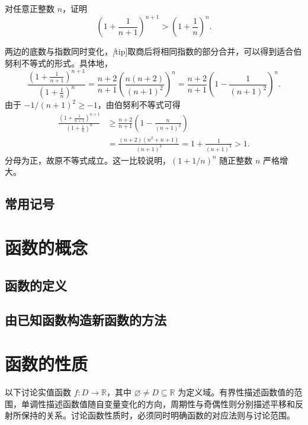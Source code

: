 \begin{example}
\label{ex:bernoulli-adjacent-powers}
对任意正整数 $n$，证明
\[
    \left(1+\frac1{n+1}\right)^{n+1}
    >\left(1+\frac1n\right)^n.
\]
\end{example}

\begin{solve}
两边的底数与指数同时变化，\emph[tip]{取商后将相同指数的部分合并，可以得到适合伯努利不等式的形式。}具体地，
\[
    \frac{\left(1+\frac1{n+1}\right)^{n+1}}
         {\left(1+\frac1n\right)^n}
    =\frac{n+2}{n+1}
      \left(\frac{n(n+2)}{(n+1)^2}\right)^n
    =\frac{n+2}{n+1}
      \left(1-\frac1{(n+1)^2}\right)^n.
\]
由于 $-1/(n+1)^2\geq-1$，由伯努利不等式可得
\[
    \begin{aligned}
        \frac{\left(1+\frac1{n+1}\right)^{n+1}}
             {\left(1+\frac1n\right)^n}
        &\geq\frac{n+2}{n+1}
          \left(1-\frac{n}{(n+1)^2}\right)\\
        &=\frac{(n+2)(n^2+n+1)}{(n+1)^3}
          =1+\frac1{(n+1)^3}>1.
    \end{aligned}
\]
分母为正，故原不等式成立。这一比较说明，$(1+1/n)^n$ 随正整数 $n$ 严格增大。
\end{solve}

\subsection{常用记号}
\label{subsec:common-notation}

\section{函数的概念}
\label{sec:concept-of-functions}

\subsection{函数的定义}
\label{subsec:definition-of-functions}

\subsection{由已知函数构造新函数的方法}
\label{subsec:constructing-functions}

\section{函数的性质}
\label{sec:properties-of-functions}

以下讨论实值函数 $f:D\to\mathbb{R}$，其中 $\varnothing\neq D\subseteq\mathbb{R}$ 为定义域。有界性描述函数值的范围，单调性描述函数值随自变量变化的方向，周期性与奇偶性则分别描述平移和反射所保持的关系。讨论函数性质时，必须同时明确函数的对应法则与讨论范围。

